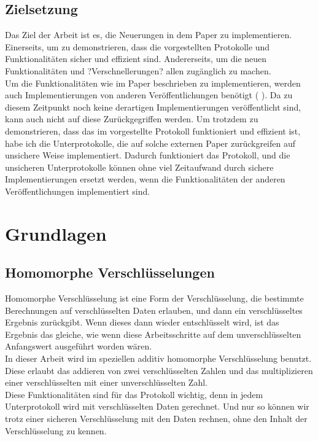 \documentclass[a4paper,10pt]{scrartcl}
\begin{document}
\subsection{Zielsetzung}
Das Ziel der Arbeit ist es, die Neuerungen in dem Paper \cite{Doettling2021} zu implementieren. Einerseits, um zu demonstrieren, dass die vorgestellten Protokolle und Funktionalitäten sicher und effizient sind. Andererseits, um die neuen Funktionalitäten und ?Verschnellerungen? allen zugänglich zu machen.\\
Um die Funktionalitäten wie im Paper \cite{Doettling2021} beschrieben zu implementieren, werden auch Implementierungen von anderen Veröffentlichungen benötigt (\cite{paar andere} ). Da zu diesem Zeitpunkt noch keine derartigen Implementierungen veröffentlicht sind, kann auch nicht auf diese Zurückgegriffen werden. Um trotzdem zu demonstrieren, dass das im \cite{Doettling2021} vorgestellte Protokoll funktioniert und effizient ist, habe ich die Unterprotokolle, die auf solche externen Paper zurückgreifen auf unsichere Weise implementiert. Dadurch funktioniert das Protokoll, und die unsicheren Unterprotokolle können ohne viel Zeitaufwand durch sichere Implementierungen ersetzt werden, wenn die Funktionalitäten der anderen Veröffentlichungen implementiert sind.



\section{Grundlagen}

\subsection{Homomorphe Verschlüsselungen}
Homomorphe Verschlüsselung ist eine Form der Verschlüsselung, die bestimmte Berechnungen auf verschlüsselten Daten erlauben, und dann ein verschlüsseltes Ergebnis zurückgibt. Wenn dieses dann wieder entschlüsselt wird, ist das Ergebnis das gleiche, wie wenn diese Arbeitsschritte auf dem unverschlüsselten Anfangswert ausgeführt worden wären. \cite{Yi2014} \\
In dieser Arbeit wird im speziellen additiv homomorphe Verschlüsselung benutzt. Diese  erlaubt das addieren von zwei verschlüsselten Zahlen und das multiplizieren einer verschlüsselten mit einer unverschlüsselten Zahl.\\
Diese Funktionalitäten sind für das Protokoll wichtig, denn in jedem Unterprotokoll wird mit verschlüsselten Daten gerechnet. Und nur so können wir trotz einer sicheren Verschlüsselung mit den Daten rechnen, ohne den Inhalt der Verschlüsselung zu kennen.
\end{document}
